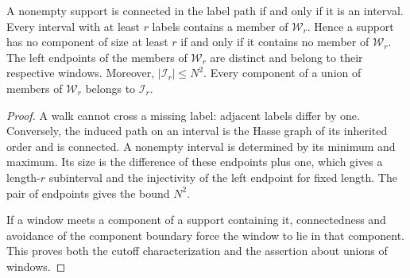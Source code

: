 \begin{lemma}
    \label{thm:cluster_label_window_geometry}
    \leanok

    A nonempty support is connected in the label path if and only if it is
    an interval. Every interval with at least $r$ labels contains a member
    of $\mathcal W_r$. Hence a support has no component of size at least
    $r$ if and only if it contains no member of $\mathcal W_r$.
    The left endpoints of the members of $\mathcal W_r$ are distinct and
    belong to their respective windows. Moreover, $|\mathcal I_r|\leq N^2$.
    Every component of a union of members of $\mathcal W_r$ belongs to
    $\mathcal I_r$.
\end{lemma}
\begin{proof}\leanok
    A walk cannot cross a missing label: adjacent labels differ by one.
    Conversely, the induced path on an interval is the Hasse graph of its
    inherited order and is connected. A nonempty interval is determined
    by its minimum and maximum. Its size is the difference of these
    endpoints plus one, which gives a length-$r$ subinterval and the
    injectivity of the left endpoint for fixed length. The pair of
    endpoints gives the bound $N^2$.

    If a window meets a component of a support containing it, connectedness
    and avoidance of the component boundary force the window to lie in
    that component. This proves both the cutoff characterization and
    the assertion about unions of windows.
\end{proof}


